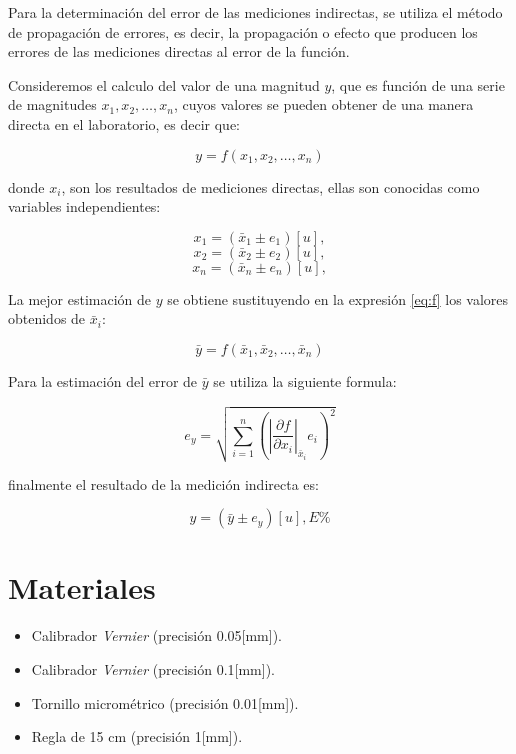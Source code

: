\documentclass[letter,11pt]{article}
\begin{document}
Para la determinación del error de las mediciones indirectas, se utiliza el
método de propagación de errores, es decir, la propagación o efecto que
producen los errores de las mediciones directas al error de la función.

Consideremos el calculo del valor de una magnitud $y$, que es función de una
serie de magnitudes $x_1, x_2, \dots, x_n$, cuyos valores se pueden obtener de
una manera directa en el laboratorio, es decir que:

\begin{equation}
\label{eq:f}
    y = f(x_1,x_2,\dots,x_n)
\end{equation}

donde $x_i$, son los resultados de mediciones directas, ellas son conocidas como
variables independientes:

\begin{equation}x_1 = (\bar{x}_1 \pm e_1)[u],\end{equation}
\begin{equation}x_2 = (\bar{x}_2 \pm e_2)[u],\end{equation}
\begin{equation}x_n = (\bar{x}_n \pm e_n)[u],\end{equation}

La mejor estimación de $y$ se obtiene sustituyendo en la expresión \ref{eq:f}
los valores obtenidos de $\bar{x}_i$:

\begin{equation}
    \bar{y} = f(\bar{x}_1,\bar{x}_2,\dots,\bar{x}_n)
\end{equation}

Para la estimación del error de $\bar{y}$ se utiliza la siguiente formula:

\begin{equation}
    e_y = \sqrt{\sum_{i=1}^{n}
    \left(\left|\frac{\partial{f}}{\partial{x_i}}\right|_{\bar{x}_i}
    e_i\right)^2}
\end{equation}

finalmente el resultado de la medición indirecta es:

\begin{equation}
    y = (\bar{y} \pm e_y)[u], E\%
\end{equation}

\section{Materiales}
\begin{itemize}
\item Calibrador \emph{Vernier} (precisión 0.05[mm]).
\item Calibrador \emph{Vernier} (precisión 0.1[mm]).
\item Tornillo micrométrico (precisión 0.01[mm]).
\item Regla de 15 cm (precisión 1[mm]).
\end{itemize}
\end{document}

